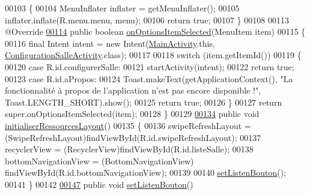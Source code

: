 \begin{DoxyCode}
00103     \{
00104         MenuInflater inflater = getMenuInflater();
00105         inflater.inflate(R.menu.menu, menu);
00106         \textcolor{keywordflow}{return} \textcolor{keyword}{true};
00107     \}
00108 
00113     @Override
\hyperlink{classcom_1_1lasalle_1_1meeting_1_1_main_activity_aa75ab3607c240fd26857f7eb6314e8bb}{00114}     \textcolor{keyword}{public} \textcolor{keywordtype}{boolean} \hyperlink{classcom_1_1lasalle_1_1meeting_1_1_main_activity_aa75ab3607c240fd26857f7eb6314e8bb}{onOptionsItemSelected}(MenuItem item)
00115     \{
00116         \textcolor{keyword}{final} Intent intent = \textcolor{keyword}{new} Intent(\hyperlink{classcom_1_1lasalle_1_1meeting_1_1_main_activity}{MainActivity}.this, 
      \hyperlink{classcom_1_1lasalle_1_1meeting_1_1_configuration_salle_activity}{ConfigurationSalleActivity}.class);
00117 
00118         \textcolor{keywordflow}{switch} (item.getItemId())
00119         \{
00120             \textcolor{keywordflow}{case} R.id.configurerSalle:
00121                 startActivity(intent);
00122                 \textcolor{keywordflow}{return} \textcolor{keyword}{true};
00123             \textcolor{keywordflow}{case} R.id.aPropos:
00124                 Toast.makeText(getApplicationContext(), \textcolor{stringliteral}{"La fonctionnalité à propos de l'application n'est
       pas encore disponible !"}, Toast.LENGTH\_SHORT).show();
00125                 \textcolor{keywordflow}{return} \textcolor{keyword}{true};
00126         \}
00127         \textcolor{keywordflow}{return} super.onOptionsItemSelected(item);
00128     \}
00129 
\hyperlink{classcom_1_1lasalle_1_1meeting_1_1_main_activity_a2622b1b85884f9d66038adfc162b2c30}{00134}     \textcolor{keyword}{public} \textcolor{keywordtype}{void} \hyperlink{classcom_1_1lasalle_1_1meeting_1_1_main_activity_a2622b1b85884f9d66038adfc162b2c30}{initialiserRessourcesLayout}()
00135     \{
00136         swipeRefreshLayout = (SwipeRefreshLayout)findViewById(R.id.swipeRefreshLayout);
00137         recyclerView = (RecyclerView)findViewById(R.id.listeSalle);
00138         bottomNavigationView = (BottomNavigationView) findViewById(R.id.bottomNavigationView);
00139 
00140         \hyperlink{classcom_1_1lasalle_1_1meeting_1_1_main_activity_a6bd5bed490e4679df4c4edbb0ce9a4cc}{setListenBouton}();
00141     \}
00142 
\hyperlink{classcom_1_1lasalle_1_1meeting_1_1_main_activity_a6bd5bed490e4679df4c4edbb0ce9a4cc}{00147}     \textcolor{keyword}{public} \textcolor{keywordtype}{void} \hyperlink{classcom_1_1lasalle_1_1meeting_1_1_main_activity_a6bd5bed490e4679df4c4edbb0ce9a4cc}{setListenBouton}()

\end{DoxyCode}
